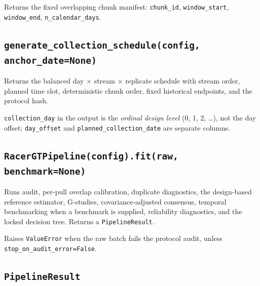 \documentclass[12pt,a4paper,oneside]{article}
\begin{document}
Returns the fixed overlapping chunk manifest: \texttt{chunk\_id},
\texttt{window\_start}, \texttt{window\_end}, \texttt{n\_calendar\_days}.

\subsection{\texttt{generate\_collection\_schedule(config, anchor\_date=None)}}

Returns the balanced day $\times$ stream $\times$ replicate schedule with stream
order, planned time slot, deterministic chunk order, fixed historical endpoints,
and the protocol hash.

\begin{remark}
\texttt{collection\_day} in the output is the \emph{ordinal design level}
(0, 1, 2, \dots), not the day offset; \texttt{day\_offset} and
\texttt{planned\_collection\_date} are separate columns.
\end{remark}

\subsection{\texttt{RacerGTPipeline(config).fit(raw, benchmark=None)}}

Runs audit, per-pull overlap calibration, duplicate diagnostics, the
design-based reference estimator, G-studies, covariance-adjusted consensus,
temporal benchmarking when a benchmark is supplied, reliability diagnostics, and
the locked decision tree. Returns a \texttt{PipelineResult}.

Raises \texttt{ValueError} when the raw batch fails the protocol audit, unless
\texttt{stop\_on\_audit\_error=False}.

\subsection{\texttt{PipelineResult}}
\end{document}

